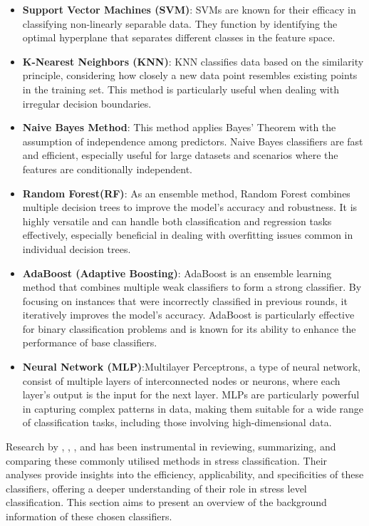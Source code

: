 \begin{itemize}
    \item \textbf{Support Vector Machines (SVM)}: SVMs are known for their efficacy in classifying non-linearly separable data. They function by identifying the optimal hyperplane that separates different classes in the feature space.
    \item \textbf{K-Nearest Neighbors (KNN)}: KNN classifies data based on the similarity principle, considering how closely a new data point resembles existing points in the training set. This method is particularly useful when dealing with irregular decision boundaries.
    \item \textbf{Naive Bayes Method}: This method applies Bayes' Theorem with the assumption of independence among predictors. Naive Bayes classifiers are fast and efficient, especially useful for large datasets and scenarios where the features are conditionally independent.
    \item \textbf{Random Forest(RF)}: As an ensemble method, Random Forest combines multiple decision trees to improve the model's accuracy and robustness. It is highly versatile and can handle both classification and regression tasks effectively, especially beneficial in dealing with overfitting issues common in individual decision trees.
    \item  \textbf{AdaBoost (Adaptive Boosting)}: AdaBoost is an ensemble learning method that combines multiple weak classifiers to form a strong classifier. By focusing on instances that were incorrectly classified in previous rounds, it iteratively improves the model's accuracy. AdaBoost is particularly effective for binary classification problems and is known for its ability to enhance the performance of base classifiers.
    \item \textbf{Neural Network (MLP)}:Multilayer Perceptrons, a type of neural network, consist of multiple layers of interconnected nodes or neurons, where each layer's output is the input for the next layer. MLPs are particularly powerful in capturing complex patterns in data, making them suitable for a wide range of classification tasks, including those involving high-dimensional data.
\end{itemize}

Research by \textcite{machine}, \textcite{1}, \textcite{review2021}, and \textcite{Sharma2012} has been instrumental in reviewing, summarizing, and comparing these commonly utilised methods in stress classification. Their analyses provide insights into the efficiency, applicability, and specificities of these classifiers, offering a deeper understanding of their role in stress level classification. This section aims to present an overview of the background information of these chosen classifiers.

